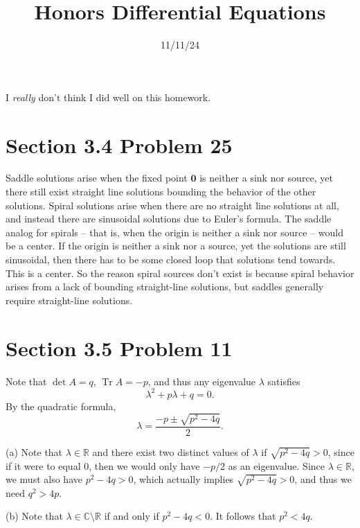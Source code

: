 \documentclass[11pt, letterpaper]{report}
\title{Honors Differential Equations}
\date{11/11/24}
\DeclareMathOperator{\Tr}{Tr}
\begin{document}
\makeproblem
I \emph{really} don't think I did well on this homework.
\section*{Section 3.4 Problem 25}
Saddle solutions arise when the fixed point $\mathbf{0}$ is neither a sink nor source, yet there still exist straight line solutions bounding the behavior of the other solutions. Spiral solutions arise when there are no straight line solutions at all, and instead there are sinusoidal solutions due to Euler's formula. The saddle analog for spirals -- that is, when the origin is neither a sink nor source -- would be a center. If the origin is neither a sink nor a source, yet the solutions are still sinusoidal, then there has to be some closed loop that solutions tend towards. This is a center. So the reason spiral sources don't exist is because spiral behavior arises from a lack of bounding straight-line solutions, but saddles generally require straight-line solutions.
\section*{Section 3.5 Problem 11}
Note that $\det A=q$, $\Tr A=-p$, and thus any eigenvalue $\lambda $ satisfies
\[
	\lambda ^2+p\lambda +q=0
.\]
By the quadratic formula,
\[
	\lambda =\frac{-p\pm \sqrt{p^2-4q} }{2}
.\]

(a) Note that $\lambda \in\mathbb{R}$ and there exist two distinct values of $\lambda $ if $\sqrt{p^2-4q} >0$, since if it were to equal $0$, then we would only have $-p /2$ as an eigenvalue. Since $\lambda \in\mathbb{R}$, we must also have $p^2-4q>0$, which actually implies $\sqrt{p^2-4q} >0$, and thus we need $q^2>4p$.

(b) Note that $\lambda \in\mathbb{C}\setminus\mathbb{R}$ if and only if $p^2-4q<0$. It follows that $p^2<4q$.
\end{document}
